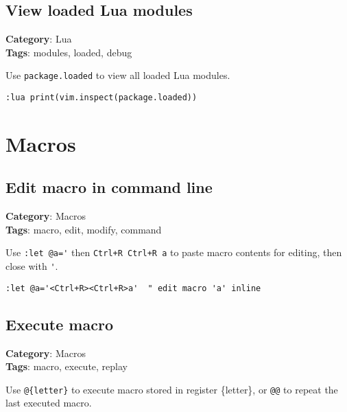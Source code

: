 {{{{{{\section{View loaded Lua modules}

\textbf{Category}: Lua\\ \textbf{Tags}: modules, loaded, debug
\vspace{0.5cm}

Use {\footnotesize \Verb§package.loaded§} to view all loaded Lua modules.

\begin{Exa*}{}
\begin{Verbatim}[fontsize=\footnotesize, breaklines, breakanywhere]
:lua print(vim.inspect(package.loaded))
\end{Verbatim}
\end{Exa*}

\chapter{Macros}
\section{Edit macro in command line}

\textbf{Category}: Macros\\ \textbf{Tags}: macro, edit, modify, command
\vspace{0.5cm}

Use {\footnotesize \Verb§:let @a='§} then {\footnotesize \Verb§Ctrl+R Ctrl+R a§} to paste macro contents for editing, then close with {\footnotesize \Verb§'§}.

\begin{Exa*}{}
\begin{Verbatim}[fontsize=\footnotesize, breaklines, breakanywhere]
:let @a='<Ctrl+R><Ctrl+R>a'  " edit macro 'a' inline
\end{Verbatim}
\end{Exa*}

\section{Execute macro}

\textbf{Category}: Macros\\ \textbf{Tags}: macro, execute, replay
\vspace{0.5cm}

Use {\footnotesize \Verb§@{letter}§} to execute macro stored in register \{letter\}, or {\footnotesize \Verb§@@§} to repeat the last executed macro.

}}}}}}
